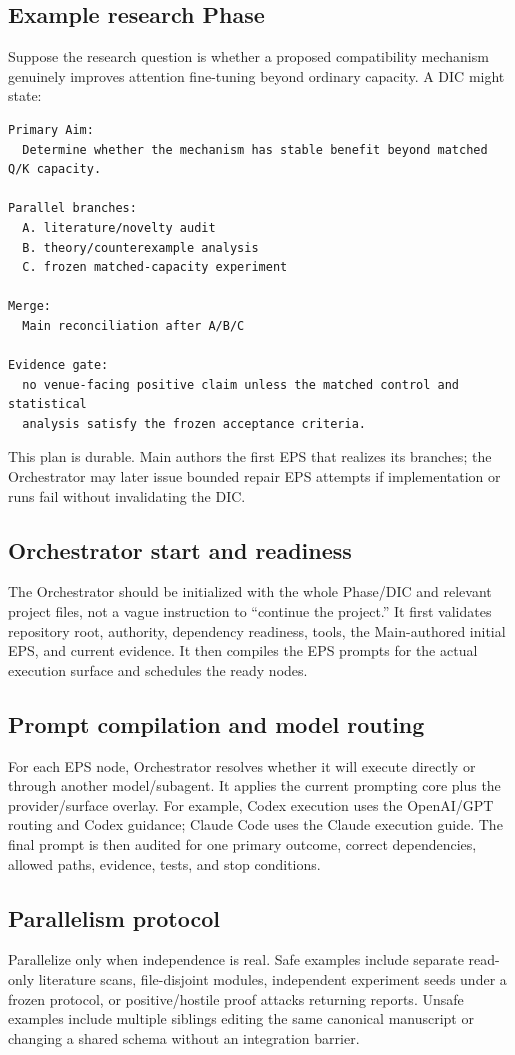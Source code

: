 \documentclass[11pt,a4paper]{article}
\begin{document}
\subsection{Example research Phase}
Suppose the research question is whether a proposed compatibility mechanism genuinely improves attention fine-tuning beyond ordinary capacity. A DIC might state:
\begin{lstlisting}[style=workflow]
Primary Aim:
  Determine whether the mechanism has stable benefit beyond matched Q/K capacity.

Parallel branches:
  A. literature/novelty audit
  B. theory/counterexample analysis
  C. frozen matched-capacity experiment

Merge:
  Main reconciliation after A/B/C

Evidence gate:
  no venue-facing positive claim unless the matched control and statistical
  analysis satisfy the frozen acceptance criteria.
\end{lstlisting}
This plan is durable. Main authors the first EPS that realizes its branches; the Orchestrator may later issue bounded repair EPS attempts if implementation or runs fail without invalidating the DIC.

\subsection{Orchestrator start and readiness}
The Orchestrator should be initialized with the whole Phase/DIC and relevant project files, not a vague instruction to ``continue the project.'' It first validates repository root, authority, dependency readiness, tools, the Main-authored initial EPS, and current evidence. It then compiles the EPS prompts for the actual execution surface and schedules the ready nodes.

\subsection{Prompt compilation and model routing}
For each EPS node, Orchestrator resolves whether it will execute directly or through another model/subagent. It applies the current prompting core plus the provider/surface overlay. For example, Codex execution uses the OpenAI/GPT routing and Codex guidance; Claude Code uses the Claude execution guide. The final prompt is then audited for one primary outcome, correct dependencies, allowed paths, evidence, tests, and stop conditions.

\subsection{Parallelism protocol}
Parallelize only when independence is real. Safe examples include separate read-only literature scans, file-disjoint modules, independent experiment seeds under a frozen protocol, or positive/hostile proof attacks returning reports. Unsafe examples include multiple siblings editing the same canonical manuscript or changing a shared schema without an integration barrier.
\end{document}
